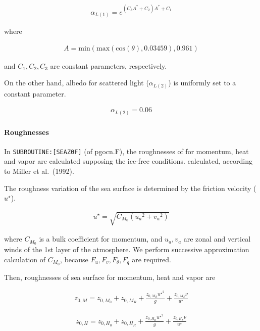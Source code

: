 \begin{eqnarray}
    \alpha_{L(1)} = e^{(C_3A^* + C_2) A^* +C_1}
\end{eqnarray}

where

\begin{eqnarray}
    A = \mathrm{min}(\mathrm{max}(\mathrm{cos}(\theta),0.03459),0.961)
\end{eqnarray}

and \(C_1,C_2,C_3\) are constant parameters, respectively.

On the other hand, albedo for scattered light (\(\alpha_{L(2)}\)) is
uniformly set to a constant parameter.

\begin{eqnarray}
    \alpha_{L(2)} = 0.06
\end{eqnarray}

\hypertarget{roughnesses}{%
\paragraph{Roughnesses}\label{roughnesses}}

In \texttt{SUBROUTINE:{[}SEAZ0F{]}} (of pgocn.F), the roughnesses of for
momentum, heat and vapor are calculated supposing the ice-free
conditions. calculated, according to Miller et al.~(1992).

The roughness variation of the sea surface is determined by the friction
velocity (\(u^\star\)).

\begin{eqnarray}
u^{\star} = \sqrt{C_{M_0} ({u_a}^2  +{v_a}^2)}
\end{eqnarray}

where \(C_{M_0}\) is a bulk coefficient for momentum, and \(u_a,v_a\)
are zonal and vertical winds of the 1st layer of the atmosphere. We
perform successive approximation calculation of \({C_{M_0}}\), because
\(F_u,F_v,F_\theta,F_q\) are required.

Then, roughnesses of sea surface for momentum, heat and vapor are

\begin{eqnarray}
    z_{0,M} = z_{0,M_0} + z_{0,M_R} + \frac{z_{0,M_R} {u^\star }^2 }{g} + \frac{z_{0,M_S}\nu }{u^\star}
\end{eqnarray}

\begin{eqnarray}
    z_{0,H} = z_{0,H_0} + z_{0,H_R} + \frac{z_{0,H_R} {u^\star }^2 }{g} + \frac{z_{0,H_S}\nu }{u^\star}
\end{eqnarray}


